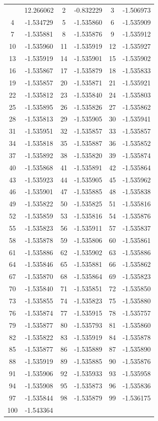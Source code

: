 \documentclass[12pt]{article}
\begin{document}
\begin{longtable}{@{}cc|cc|cc@{}}
\bottomrule
\endlastfoot
1 & 12.266062 & 2 & -0.832229 & 3 & -1.506973 \\
4 & -1.534729 & 5 & -1.535860 & 6 & -1.535909 \\
7 & -1.535881 & 8 & -1.535876 & 9 & -1.535912 \\
10 & -1.535960 & 11 & -1.535919 & 12 & -1.535927 \\
13 & -1.535919 & 14 & -1.535901 & 15 & -1.535902 \\
16 & -1.535867 & 17 & -1.535879 & 18 & -1.535833 \\
19 & -1.535857 & 20 & -1.535871 & 21 & -1.535921 \\
22 & -1.535812 & 23 & -1.535840 & 24 & -1.535803 \\
25 & -1.535895 & 26 & -1.535826 & 27 & -1.535862 \\
28 & -1.535813 & 29 & -1.535905 & 30 & -1.535941 \\
31 & -1.535951 & 32 & -1.535857 & 33 & -1.535857 \\
34 & -1.535818 & 35 & -1.535887 & 36 & -1.535852 \\
37 & -1.535892 & 38 & -1.535820 & 39 & -1.535874 \\
40 & -1.535868 & 41 & -1.535891 & 42 & -1.535864 \\
43 & -1.535923 & 44 & -1.535905 & 45 & -1.535962 \\
46 & -1.535901 & 47 & -1.535885 & 48 & -1.535838 \\
49 & -1.535822 & 50 & -1.535825 & 51 & -1.535816 \\
52 & -1.535859 & 53 & -1.535816 & 54 & -1.535876 \\
55 & -1.535823 & 56 & -1.535911 & 57 & -1.535837 \\
58 & -1.535878 & 59 & -1.535806 & 60 & -1.535861 \\
61 & -1.535886 & 62 & -1.535902 & 63 & -1.535886 \\
64 & -1.535846 & 65 & -1.535881 & 66 & -1.535862 \\
67 & -1.535870 & 68 & -1.535864 & 69 & -1.535823 \\
70 & -1.535840 & 71 & -1.535851 & 72 & -1.535850 \\
73 & -1.535855 & 74 & -1.535823 & 75 & -1.535880 \\
76 & -1.535874 & 77 & -1.535915 & 78 & -1.535757 \\
79 & -1.535877 & 80 & -1.535793 & 81 & -1.535860 \\
82 & -1.535822 & 83 & -1.535919 & 84 & -1.535878 \\
85 & -1.535877 & 86 & -1.535889 & 87 & -1.535890 \\
88 & -1.535919 & 89 & -1.535885 & 90 & -1.535876 \\
91 & -1.535906 & 92 & -1.535933 & 93 & -1.535958 \\
94 & -1.535908 & 95 & -1.535873 & 96 & -1.535836 \\
97 & -1.535844 & 98 & -1.535879 & 99 & -1.536175 \\
100 & -1.543364 &  &  &  &  \\

\end{longtable}
\end{document}
